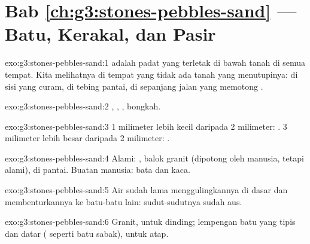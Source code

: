 \section*{Bab \ref{ch:g3:stones-pebbles-sand} --- Batu, Kerakal, dan Pasir}

\begin{solution}{exo:g3:stones-pebbles-sand:1}
 adalah  padat yang terletak di bawah tanah di semua
tempat. Kita melihatnya di tempat yang tidak ada tanah yang menutupinya: di
sisi  yang curam, di tebing pantai, di sepanjang jalan yang memotong
.
\end{solution}

\begin{solution}{exo:g3:stones-pebbles-sand:2}
, , , bongkah.
\end{solution}

\begin{solution}{exo:g3:stones-pebbles-sand:3}
1 milimeter lebih kecil daripada 2 milimeter: . 3 milimeter lebih
besar daripada 2 milimeter: .
\end{solution}

\begin{solution}{exo:g3:stones-pebbles-sand:4}
Alami: , balok granit (dipotong oleh manusia, tetapi 
alami),  di pantai. Buatan manusia: bata dan kaca.
\end{solution}

\begin{solution}{exo:g3:stones-pebbles-sand:5}
Air  sudah lama menggulingkannya di dasar  dan
membenturkannya ke batu-batu lain: sudut-sudutnya sudah aus.
\end{solution}

\begin{solution}{exo:g3:stones-pebbles-sand:6}
Granit, untuk dinding; lempengan batu yang tipis dan datar ( seperti
batu sabak), untuk atap.
\end{solution}

